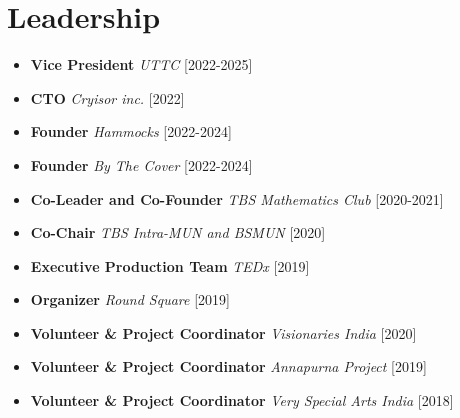 \documentclass[%
               doublesided,
               paper=a4,
               fontsize=10pt
              ]{my-resume}
\begin{document}
{    \section{Leadership}
        \begin{itemize}
            \item \textbf{Vice President} \textit{UTTC} [2022-2025]
            \item \textbf{CTO} \textit{Cryisor inc.} [2022]
            \item \textbf{Founder} \textit{Hammocks} [2022-2024]
            \item \textbf{Founder} \textit{By The Cover} [2022-2024]
            \item \textbf{Co-Leader and Co-Founder} \textit{TBS Mathematics Club} [2020-2021]
            \item \textbf{Co-Chair} \textit{TBS Intra-MUN and BSMUN} [2020]
            \item \textbf{Executive Production Team} \textit{TEDx} [2019]
            \item \textbf{Organizer} \textit{Round Square} [2019]
            \item \textbf{Volunteer \& Project Coordinator} \textit{Visionaries India} [2020]
            \item \textbf{Volunteer \& Project Coordinator} \textit{Annapurna Project} [2019]
            \item \textbf{Volunteer \& Project Coordinator} \textit{Very Special Arts India} [2018]
        \end{itemize}

        
        
        
}
\end{document}
